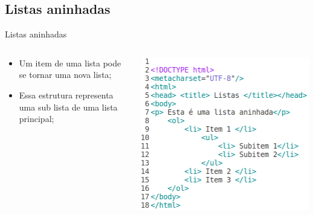 \documentclass{beamer}
\begin{document}
\subsection{Listas aninhadas}
\begin{frame}{Listas aninhadas}
  \begin{columns}
    \begin{column}{0.45 \textwidth}
     \begin{itemize}
      \item Um item de uma lista pode se tornar uma nova lista;
       \item Essa estrutura representa uma sub lista de uma lista 
principal;
     \end{itemize}
    \end{column}
    \begin{column}{0.5\textwidth}
     \includegraphics[height=0.55\paperheight]{fig/aula1/html5.png}
    \end{column}
  \end{columns}
\end{frame}
\end{document}
